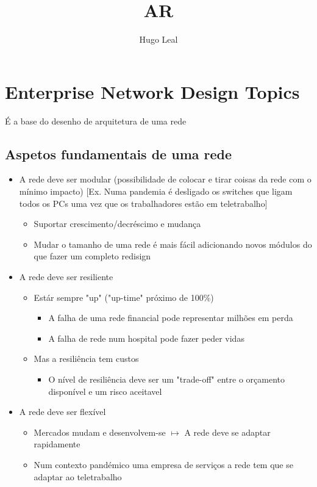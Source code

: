 \documentclass{easyclass}
\begin{document}
\begin{titlepage}
    \courseid{}
    \title{AR}
    \author{Hugo Leal}
    \instructor{}
    \maketitle
\end{titlepage}

\tableofcontents

\section{Enterprise Network Design Topics}
É a base do desenho de arquitetura de uma rede 
\subsection{Aspetos fundamentais de uma rede}
\begin{itemize}
    \item A rede deve ser modular (possibilidade de colocar e tirar coisas da rede com o mínimo impacto) [Ex. Numa pandemia é desligado os switches que ligam todos os PCs uma vez que os trabalhadores estão em teletrabalho]
    \begin{itemize}
        \item Suportar crescimento/decréscimo e mudança
        \item Mudar o tamanho de uma rede é mais fácil adicionando novos módulos do que fazer um completo redisign
    \end{itemize}
    \item A rede deve ser resiliente
    \begin{itemize}
        \item Estár sempre "up" ("up-time" próximo de 100\%)
        \begin{itemize}
            \item A falha de uma rede financial pode representar milhões em perda
            \item A falha de rede num hospital pode fazer peder vidas
        \end{itemize}
        \item Mas a resiliência tem custos
        \begin{itemize}
            \item O nível de resiliência deve ser um "trade-off" entre o orçamento disponível e um risco aceitavel  
        \end{itemize}
    \end{itemize}
    \item A rede deve ser flexível
    \begin{itemize}
        \item Mercados mudam e desenvolvem-se $ \mapsto $ A rede deve se adaptar rapidamente
        \item Num contexto pandémico uma empresa de serviços a rede tem que se adaptar ao teletrabalho
    \end{itemize}
\end{itemize}
\end{document}
